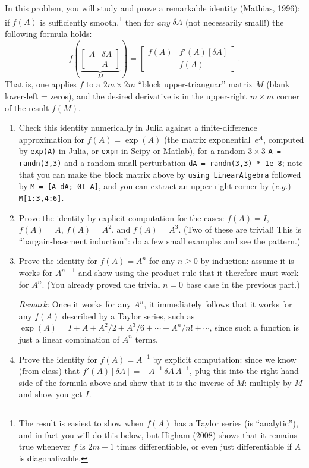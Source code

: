 \documentclass[10pt,oneside]{article}
\begin{document}
In this problem, you will study and prove a remarkable identity (Mathias, 1996): if $f(A)$ is sufficiently smooth,\footnote{The result is easiest to show when $f(A)$ has a Taylor series (is ``analytic''), and in fact you will do this below, but Higham (2008) shows that it remains true whenever $f$ is $2m-1$ times differentiable, or even just differentiable if $A$ is diagonalizable.} then for \emph{any} 
$\delta A$ (not necessarily small!) the following formula holds:
$$
f\left(\underbrace{\begin{bmatrix} A & \delta A \\ & A \end{bmatrix}}_M\right) = \begin{bmatrix} f(A) & f'(A)[\delta A] \\ & f(A) \end{bmatrix} \, .
$$
That is, one applies $f$ to a $2m \times 2m$ ``block upper-trianguar'' matrix $M$ (blank lower-left = zeros), and the desired derivative is in the upper-right $m \times m$ corner of the result $f(M)$.

\begin{enumerate}

\item Check this identity numerically in Julia against a finite-difference approximation for $f(A) = \exp(A)$ (the matrix exponential~$e^A$, computed by \texttt{exp(A)} in Julia, or \texttt{expm} in Scipy or Matlab), for a random $3 \times 3$ \texttt{A = randn(3,3)} and a random small perturbation \texttt{dA = randn(3,3) * 1e-8}; note that you can make the block matrix above by \texttt{using LinearAlgebra} followed by \texttt{M = [A dA; 0I A]}, and you can extract an upper-right corner by (\textit{e.g.}) \texttt{M[1:3,4:6]}.

\item Prove the identity by explicit computation for the cases: $f(A) = I$, $f(A) = A$, $f(A) = A^2$, and $f(A) = A^3$.  (Two of these are trivial!  This is ``bargain-basement induction'': do a few small examples and see the pattern.)

\item Prove the identity for $f(A) = A^n$ for any $n \ge 0$ by induction: assume it is works for $A^{n-1}$ and show using the product rule that it therefore must work for $A^n$.  (You already proved the trivial $n=0$ base case in the previous part.)

\emph{Remark:} 
Once it works for any $A^n$, it immediately follows that it works for any $f(A)$ described by a Taylor series, such as $\exp(A) = I + A + A^2/2 + A^3/6 + \cdots + A^n / n! + \cdots$, since such a function is just a linear combination of $A^n$ terms.

\item Prove the identity for $f(A) = A^{-1}$ by explicit computation: since we know (from class) that $f'(A)[\delta A] = -A^{-1} \, \delta A \, A^{-1}$, plug this into the right-hand side of the formula above and show that it is the inverse of $M$: multiply by $M$ and show you get $I$.

\end{enumerate}

 
\end{document}
